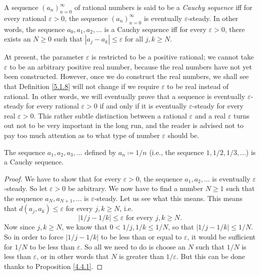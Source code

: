 \setcounter{theorem}{7}
\begin{definition}\label{5.1.8}
A sequence \((a_n)_{n = 0}^{\infty}\) of rational numbers is said to be a \emph{Cauchy sequence} iff for every rational \(\varepsilon > 0\), the sequence \((a_n)_{n = 0}^{\infty}\) is eventually \(\varepsilon\)-steady.
In other words, the sequence \(a_0, a_1, a_2, \dots\) is a Cauchy sequence iff for every \(\varepsilon > 0\), there exists an \(N \geq 0\) such that \(|a_j - a_k| \leq \varepsilon\) for all \(j, k \geq N\).
\end{definition}

\begin{remark}\label{5.1.9}
At present, the parameter \(\varepsilon\) is restricted to be a positive rational;
we cannot take \(\varepsilon\) to be an arbitrary positive real number, because the real numbers have not yet been constructed.
However, once we do construct the real numbers, we shall see that Definition \ref{5.1.8} will not change if we require \(\varepsilon\) to be real instead of rational.
In other words, we will eventually prove that a sequence is eventually \(\varepsilon\)-steady for every rational \(\varepsilon > 0\) if and only if it is eventually \(\varepsilon\)-steady for every real \(\varepsilon > 0\).
This rather subtle distinction between a rational \(\varepsilon\) and a real \(\varepsilon\) turns out not to be very important in the long run, and the reader is advised not to pay too much attention as to what type of number \(\varepsilon\) should be.
\end{remark}

\setcounter{theorem}{10}
\begin{proposition}\label{5.1.11}
The sequence \(a_1, a_2, a_3, \dots\) defined by \(a_n \coloneqq 1 / n\) (i.e., the sequence \(1, 1 / 2, 1 / 3, \dots\)) is a Cauchy sequence.
\end{proposition}

\begin{proof}
We have to show that for every \(\varepsilon > 0\), the sequence \(a_1, a_2, \dots\) is eventually \(\varepsilon\)-steady.
So let \(\varepsilon > 0\) be arbitrary.
We now have to find a number \(N \geq 1\) such that the sequence \(a_N, a_{N + 1}, \dots\) is \(\varepsilon\)-steady.
Let us see what this means.
This means that \(d(a_j, a_k) \leq \varepsilon\) for every \(j, k \geq N\), i.e.
\[
    |1 / j - 1 / k| \leq \varepsilon \text{ for every } j, k \geq N.
\]
Now since \(j, k \geq N\), we know that \(0 < 1 / j, 1 / k \leq 1 / N\), so that \(|1 / j - 1 / k| \leq 1 / N\).
So in order to force \(|1 / j - 1 / k|\) to be less than or equal to \(\varepsilon\), it would be sufficient for \(1 / N\) to be less than \(\varepsilon\).
So all we need to do is choose an \(N\) such that \(1 / N\) is less than \(\varepsilon\), or in other words that \(N\) is greater than \(1 / \varepsilon\).
But this can be done thanks to Proposition \ref{4.4.1}.
\end{proof}


